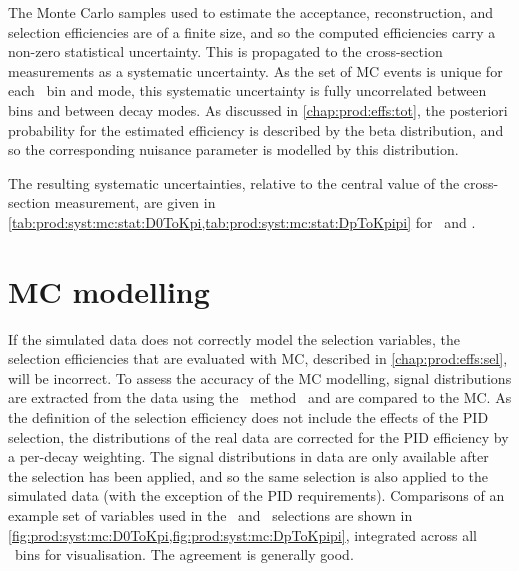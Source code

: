 The Monte Carlo samples used to estimate the acceptance, reconstruction, and 
selection efficiencies are of a finite size, and so the computed efficiencies 
carry a non-zero statistical uncertainty.
This is propagated to the cross-section measurements as a systematic 
uncertainty.
As the set of \ac{MC} events is unique for each \pTy\ bin and mode, this 
systematic uncertainty is fully uncorrelated between bins and between decay 
modes.
As discussed in \cref{chap:prod:effs:tot}, the posteriori probability 
for the estimated efficiency is described by the beta distribution, and so the 
corresponding nuisance parameter is modelled by this distribution.

The resulting systematic uncertainties, relative to the central value of the 
cross-section measurement, are given in 
\cref{tab:prod:syst:mc:stat:D0ToKpi,tab:prod:syst:mc:stat:DpToKpipi} for 
\DzToKpi\ and \DpToKpipi.

\section{\acl{MC} modelling}
\label{chap:prod:syst:mc}

If the simulated data does not correctly model the selection variables, the 
selection efficiencies that are evaluated with \ac{MC}, described in 
\cref{chap:prod:effs:sel}, will be incorrect.
To assess the accuracy of the \acl{MC} modelling, signal distributions are 
extracted from the data using the \sPlot\ method~\cite{Pivk:2004ty} and are 
compared to the \ac{MC}.
As the definition of the selection efficiency does not include the effects of 
the \ac{PID} selection, the distributions of the real data are corrected for 
the \ac{PID} efficiency by a per-decay weighting.
The signal distributions in data are only available after the selection has 
been applied, and so the same selection is also applied to the simulated data 
(with the exception of the \ac{PID} requirements).
Comparisons of an example set of variables used in the \DzToKpi\ and 
\DpToKpipi\ selections are shown in 
\cref{fig:prod:syst:mc:D0ToKpi,fig:prod:syst:mc:DpToKpipi}, integrated across 
all \pTy\ bins for visualisation.
The agreement is generally good.

